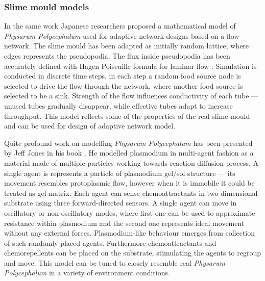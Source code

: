 \subsubsection{Slime mould models}

In the same work \cite{tero2010rules} Japanese researchers proposed a mathematical model of \textit{Physarum Polycephalum} used for adaptive network designs based on a flow network. The slime mould has been adapted as initially random lattice, where edges represents the pseudopodia. The flux inside pseudopodia has been accurately defined with Hagen-Poiseuille formula for laminar flow \cite{sutera1993history}. Simulation is conducted in discrete time steps, in each step a random food source node is selected to drive the flow through the network, where another food source is selected to be a sink. Strength of the flow influences conductivity of each tube --- unused tubes gradually disappear, while effective tubes adapt to increase throughput. This model reflects some of the properties of the real slime mould and can be used for design of adaptive network model.

Quite profound work on modelling \textit{Physarum Polycephalum} has been presented by Jeff Jones in his book \cite{jones2015pattern}. He modelled plasmodium in multi-agent fashion as a material made of multiple particles working towards reaction-diffusion process. A single agent is represents a particle of plasmodium gel/sol structure --- its movement resembles protoplasmic flow, however when it is immobile it could be treated as gel matrix. Each agent can sense chemoattractants in two-dimensional substrate using three forward-directed sensors. A single agent can move in oscillatory or non-oscillatory modes, where first one can be used to approximate resistance within plasmodium and the second one represents ideal movement without any external forces. Plasmodium-like behaviour emerges from collection of such randomly placed agents. Furthermore chemoattractants and chemorepellents can be placed on the substrate, stimulating the agents to regroup and move. This model can be tuned to closely resemble real \textit{Physarum Polycephalum} in a variety of environment conditions.

